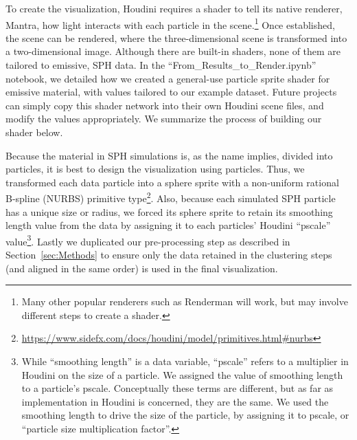 \documentclass[fleqn,usenatbib,useAMS]{mnras}
\begin{document}
To create the visualization, Houdini requires a shader to tell its native renderer, Mantra, how light interacts with each particle in the scene.\footnote{Many other popular renderers such as Renderman will work, but may involve different steps to create a shader.} Once established, the scene can be rendered, where the three-dimensional scene is transformed into a two-dimensional image. Although there are built-in shaders, none of them are tailored to emissive, SPH data. In the ``From\_Results\_to\_Render.ipynb'' notebook, we detailed how we created a general-use particle sprite shader for emissive material, with values tailored to our example dataset. Future projects can simply copy this shader network into their own Houdini scene files, and modify the values appropriately. We summarize the process of building our shader below. \par

Because the material in SPH simulations is, as the name implies, divided into particles, it is best to design the visualization using particles. Thus, we transformed each data particle into a sphere sprite with a non-uniform rational B-spline (NURBS) primitive type\footnote{\url{https://www.sidefx.com/docs/houdini/model/primitives.html\#nurbs}}. Also, because each simulated SPH particle has a unique size or radius, we forced its sphere sprite to retain its smoothing length value from the data by assigning it to each particles' Houdini ``pscale'' value\footnote{While ``smoothing length'' is a data variable, ``pscale'' refers to a multiplier in Houdini on the size of a particle. We assigned the value of smoothing length to a particle's pscale. Conceptually these terms are different, but as far as implementation in Houdini is concerned, they are the same. We used the smoothing length to drive the size of the particle, by assigning it to pscale, or ``particle size multiplication factor''.}. Lastly we duplicated our pre-processing step as described in Section~\ref{sec:Methods} to ensure only the data retained in the clustering steps (and aligned in the same order) is used in the final visualization. \par
\end{document}
